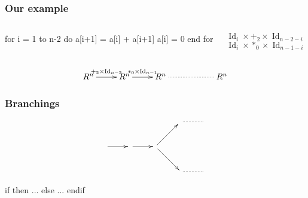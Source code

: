 \documentclass[10pt]{beamer}
\DeclareMathOperator{\Id}{Id}
\begin{document}
\begin{frame}[fragile]
  \frametitle{Our example}

  \begin{columns}

    \begin{column}{0.5\textwidth}
      \begin{center}
        \begin{minipage}{0.7\textwidth}
\begin{semiverbatim}
  \alert<2>{for i = 1 to n-2 do}
    a[i+1] = a[i] + a[i+1]
    a[i] = 0
  end for
\end{semiverbatim}
        \end{minipage}
      \end{center}
    \end{column}

    \begin{column}{0.5\textwidth}
      \begin{minipage}{0.7\textwidth}
        \begin{center}
          $\phantom{ }$\\
          $\Id_{i}\times +_2 \times\Id_{n-2-i}$\\
          $\Id_i\times *_0 \times\Id_{n-1-i}$\\
        \end{center}
      \end{minipage}
    \end{column}
  \end{columns}

  \vfill

  \begin{center}
    \[\xymatrix{
      R^n\ar[r]^{+_2\times{\Id_{n-2}}} & R^n\ar[r]^{*_0\times{\Id_{n-1}}} &
      R^{n} \ar@{.}[rr] && R^n
    }\]
  \end{center}
\end{frame}


\begin{frame}[fragile]
  \frametitle{Branchings}

  \begin{center}
    \[\xymatrix{
             &        &                 & \ar@{.}[r] & \\
      \ar[r] & \ar[r] & \ar[ru] \ar[rd] \\
             &        &                 & \ar@{.}[r] & 
    }\]
  \end{center}

  \begin{center}
    \begin{minipage}{0.7\textwidth}
\begin{semiverbatim}
  \alert<2>{if  then}
    ...
  else
    ...
  endif
\end{semiverbatim}
    \end{minipage}
  \end{center}
  
\end{frame}
\end{document}
